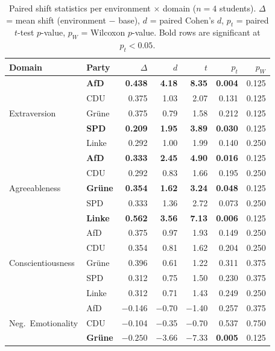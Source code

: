 \begin{table}[htbp]
\centering
\small
\caption{Paired shift statistics per environment $\times$ domain ($n=4$ students). $\Delta$ = mean shift (environment $-$ base), $d$ = paired Cohen's $d$, $p_t$ = paired $t$-test $p$-value, $p_W$ = Wilcoxon $p$-value. Bold rows are significant at $p_t<0.05$.}
\label{tab:paired-stats}
\begin{tabular}{llrrrrr}
\toprule
Domain & Party & $\Delta$ & $d$ & $t$ & $p_t$ & $p_W$ \\
\midrule
\multirow{5}{*}{Extraversion}
 & \textbf{AfD}   & \textbf{0.438} & \textbf{4.18} & \textbf{8.35} & \textbf{0.004} & 0.125 \\
 & CDU            & 0.375 & 1.03 & 2.07 & 0.131 & 0.125 \\
 & Gr\"une        & 0.375 & 0.79 & 1.58 & 0.212 & 0.125 \\
 & \textbf{SPD}   & \textbf{0.209} & \textbf{1.95} & \textbf{3.89} & \textbf{0.030} & 0.125 \\
 & Linke          & 0.292 & 1.00 & 1.99 & 0.140 & 0.250 \\
\midrule
\multirow{5}{*}{Agreeableness}
 & \textbf{AfD}   & \textbf{0.333} & \textbf{2.45} & \textbf{4.90} & \textbf{0.016} & 0.125 \\
 & CDU            & 0.292 & 0.83 & 1.66 & 0.195 & 0.250 \\
 & \textbf{Gr\"une} & \textbf{0.354} & \textbf{1.62} & \textbf{3.24} & \textbf{0.048} & 0.125 \\
 & SPD            & 0.333 & 1.36 & 2.72 & 0.073 & 0.250 \\
 & \textbf{Linke} & \textbf{0.562} & \textbf{3.56} & \textbf{7.13} & \textbf{0.006} & 0.125 \\
\midrule
\multirow{5}{*}{Conscientiousness}
 & AfD            & 0.375 & 0.97 & 1.93 & 0.149 & 0.250 \\
 & CDU            & 0.354 & 0.81 & 1.62 & 0.204 & 0.250 \\
 & Gr\"une        & 0.396 & 0.61 & 1.22 & 0.311 & 0.375 \\
 & SPD            & 0.312 & 0.75 & 1.50 & 0.230 & 0.375 \\
 & Linke          & 0.312 & 0.71 & 1.43 & 0.249 & 0.250 \\
\midrule
\multirow{5}{*}{Neg.\ Emotionality}
 & AfD            & $-$0.146 & $-$0.70 & $-$1.40 & 0.257 & 0.375 \\
 & CDU            & $-$0.104 & $-$0.35 & $-$0.70 & 0.537 & 0.750 \\
 & \textbf{Gr\"une} & $\mathbf{-0.250}$ & $\mathbf{-3.66}$ & $\mathbf{-7.33}$ & \textbf{0.005} & 0.125 \\

\end{tabular}
\end{table}
